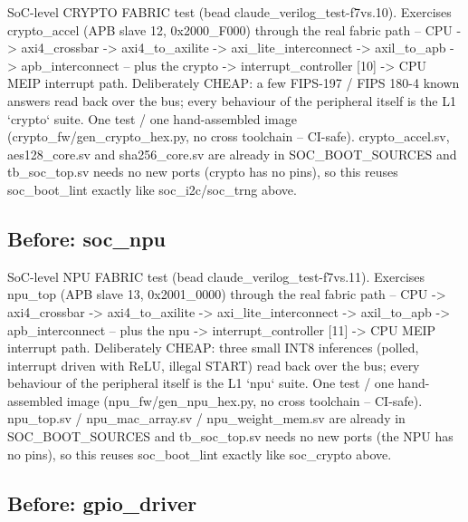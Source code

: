 \begin{record}
\begin{textblock}
SoC-level CRYPTO FABRIC test (bead claude_verilog_test-f7vs.10). Exercises crypto_accel (APB slave
12, 0x2000_F000) through the real fabric path -- CPU -> axi4_crossbar -> axi4_to_axilite ->
axi_lite_interconnect -> axil_to_apb -> apb_interconnect -- plus the crypto -> interrupt_controller
[10] -> CPU MEIP interrupt path. Deliberately CHEAP: a few FIPS-197 / FIPS 180-4 known answers read
back over the bus; every behaviour of the peripheral itself is the L1 `crypto` suite. One test / one
hand-assembled image (crypto_fw/gen_crypto_hex.py, no cross toolchain -- CI-safe). crypto_accel.sv,
aes128_core.sv and sha256_core.sv are already in SOC_BOOT_SOURCES and tb_soc_top.sv needs no new
ports (crypto has no pins), so this reuses soc_boot_lint exactly like soc_i2c/soc_trng above.
\end{textblock}

\subsection*{Before: soc\_npu}

\begin{textblock}
SoC-level NPU FABRIC test (bead claude_verilog_test-f7vs.11). Exercises npu_top (APB slave 13,
0x2001_0000) through the real fabric path -- CPU -> axi4_crossbar -> axi4_to_axilite ->
axi_lite_interconnect -> axil_to_apb -> apb_interconnect -- plus the npu -> interrupt_controller
[11] -> CPU MEIP interrupt path. Deliberately CHEAP: three small INT8 inferences (polled, interrupt
driven with ReLU, illegal START) read back over the bus; every behaviour of the peripheral itself
is the L1 `npu` suite. One test / one hand-assembled image (npu_fw/gen_npu_hex.py, no cross
toolchain -- CI-safe). npu_top.sv / npu_mac_array.sv / npu_weight_mem.sv are already in
SOC_BOOT_SOURCES and tb_soc_top.sv needs no new ports (the NPU has no pins), so this reuses
soc_boot_lint exactly like soc_crypto above.
\end{textblock}

\subsection*{Before: gpio\_driver}


\end{record}
